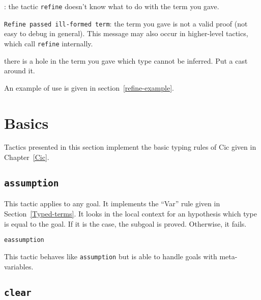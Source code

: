 \begin{ErrMsgs}
\item {}: 
  the tactic \texttt{refine} doesn't know what to do
  with the term you gave.
\item \texttt{Refine passed ill-formed term}: the term you gave is not
  a valid proof (not easy to debug in general).
  This message may also occur in higher-level tactics, which call 
  \texttt{refine} internally.
\item {}
  there is a hole in the term you gave
  which type cannot be inferred. Put a cast around it.
\end{ErrMsgs}

An example of use is given in section~\ref{refine-example}.

\section{Basics
}

Tactics presented in this section implement the basic typing rules of
{\sc Cic} given in Chapter~\ref{Cic}.

\subsection{{\tt assumption}
}

This tactic applies to any goal. It implements the
``Var'' rule given in
Section~\ref{Typed-terms}. It looks in the local context for an
hypothesis which type is equal to the goal.  If it is the case, the
subgoal is proved. Otherwise, it fails.

\begin{ErrMsgs}
\item  {}
\end{ErrMsgs}

\begin{Variants}
  \item \texttt{eassumption}

    This tactic behaves like \texttt{assumption} but is able to handle
    goals with meta-variables.

\end{Variants}


\subsection{\tt clear {\ident}
\label{clear}}

